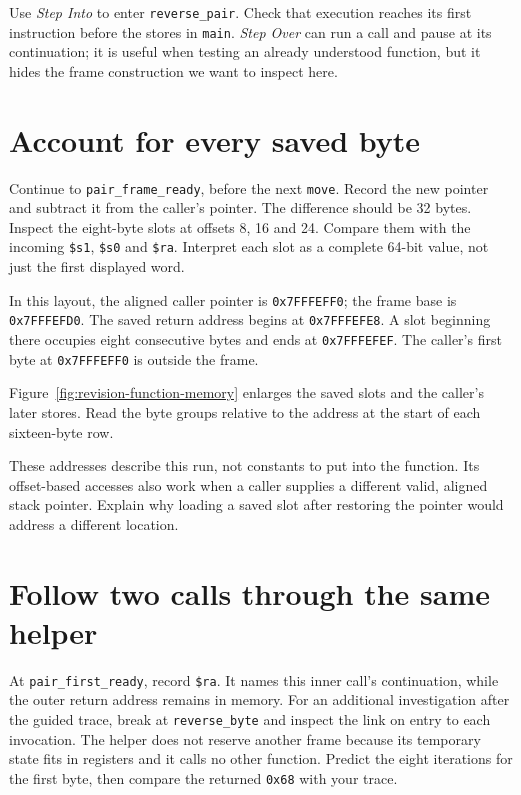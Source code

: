 Use \emph{Step Into} to enter \texttt{reverse\_pair}. Check that execution reaches
its first instruction before the stores in \texttt{main}. \emph{Step Over} can
run a call and pause at its continuation; it is useful when testing an already
understood function, but it hides the frame construction we want to inspect here.

\section{Account for every saved byte}

Continue to \texttt{pair\_frame\_ready}, before the next \texttt{move}. Record the
new pointer and subtract it from the caller's pointer. The difference should be
32 bytes. Inspect the eight-byte slots at offsets 8, 16 and 24. Compare them with
the incoming \texttt{\$s1}, \texttt{\$s0} and \texttt{\$ra}. Interpret each slot
as a complete 64-bit value, not just the first displayed word.

In this layout, the aligned caller pointer is \texttt{0x7FFFEFF0}; the frame base
is \texttt{0x7FFFEFD0}. The saved return address begins at
\texttt{0x7FFFEFE8}. A slot beginning there occupies eight consecutive bytes and
ends at \texttt{0x7FFFEFEF}. The caller's first byte at
\texttt{0x7FFFEFF0} is outside the frame.

Figure~\ref{fig:revision-function-memory} enlarges the saved slots and the
caller's later stores. Read the byte groups relative to the address at the start
of each sixteen-byte row.



These addresses describe this run, not constants to put into the function.
Its offset-based accesses also work when a caller supplies a different valid,
aligned stack pointer. Explain why loading a saved slot after restoring the
pointer would address a different location.

\section{Follow two calls through the same helper}

At \texttt{pair\_first\_ready}, record \texttt{\$ra}. It names this inner
call's continuation, while the outer return address remains in memory. For an
additional investigation after the guided trace, break at \texttt{reverse\_byte}
and inspect the link on entry to each invocation.
The helper does not reserve another frame because its temporary state fits in
registers and it calls no other function. Predict the eight iterations for the
first byte, then compare the returned \texttt{0x68} with your trace.

